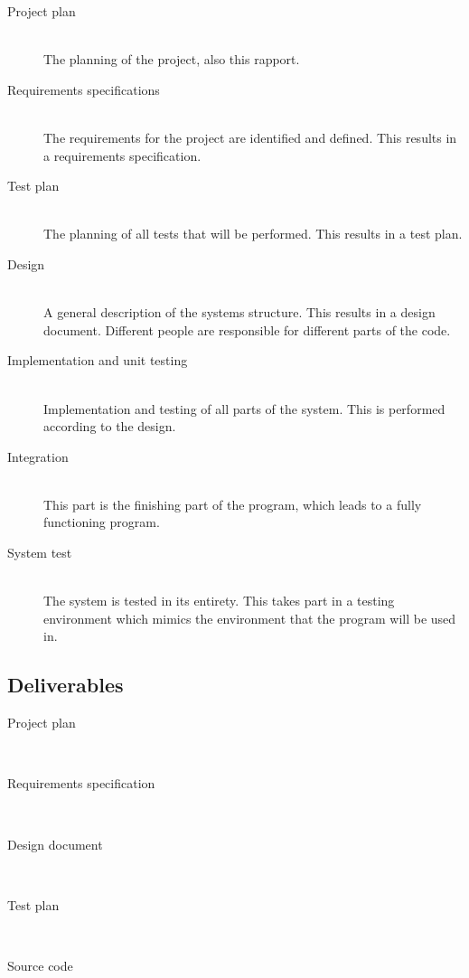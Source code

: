 \documentclass[12pt,titlepage]{article}
\begin{document}
\begin{description}
	\item[Project plan] \hfill \\
		The planning of the project, also this rapport.
	\item[Requirements specifications] \hfill \\
		The requirements for the project are identified and defined.
		This results in a requirements specification.
	\item[Test plan] \hfill \\
		The planning of all tests that will be performed.
		This results in a test plan.
	\item[Design] \hfill \\
		A general description of the systems structure.
		This results in a design document.
		Different people are responsible for different parts of the code.
	\item[Implementation and unit testing] \hfill \\
		Implementation and testing of all parts of the system.
		This is performed according to the design.
	\item[Integration] \hfill \\
		This part is the finishing part of the program,
		which leads to a fully functioning program.
	\item[System test] \hfill \\
		The system is tested in its entirety. This takes part in a
		testing environment which mimics the environment that the
		program will be used in.
\end{description}

\subsection{Deliverables}

\begin{description}
	\item[Project plan] \hfill \\
	\item[Requirements specification] \hfill \\
	\item[Design document] \hfill \\
	\item[Test plan] \hfill \\
	\item[Source code] \hfill \\
\end{description}
\end{document}
